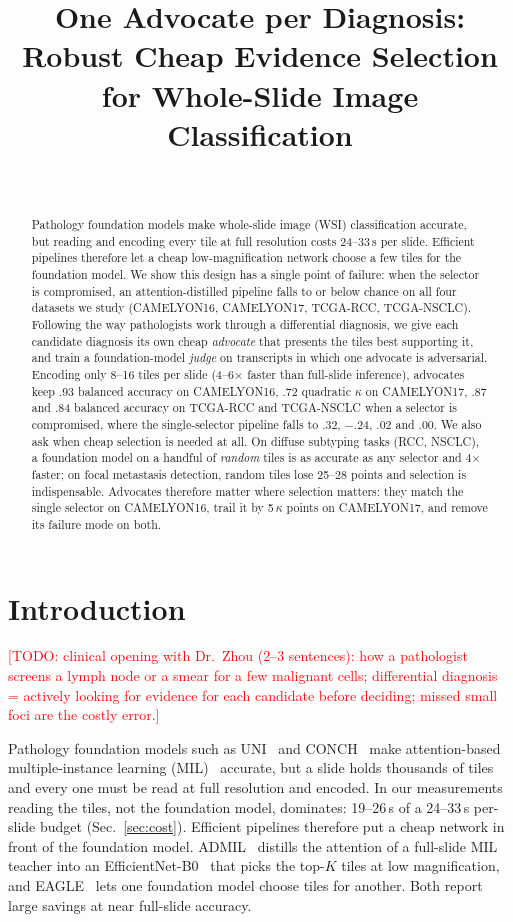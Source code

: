 \documentclass[10pt,twocolumn]{article}
\title{\Large\bfseries One Advocate per Diagnosis: Robust Cheap Evidence Selection\\for Whole-Slide Image Classification}
\author{\todo{authors: you, Dr.\ Chen Zhou, advisor} \\ \todo{affiliations}}
\date{}
\newcommand{\todo}[1]{\textcolor{red}{[TODO: #1]}}
\begin{document}
\maketitle

\begin{abstract}
Pathology foundation models make whole-slide image (WSI) classification accurate, but reading and encoding every tile at full resolution costs 24--33\,s per slide. Efficient pipelines therefore let a cheap low-magnification network choose a few tiles for the foundation model. We show this design has a single point of failure: when the selector is compromised, an attention-distilled pipeline falls to or below chance on all four datasets we study (CAMELYON16, CAMELYON17, TCGA-RCC, TCGA-NSCLC). Following the way pathologists work through a differential diagnosis, we give each candidate diagnosis its own cheap \emph{advocate} that presents the tiles best supporting it, and train a foundation-model \emph{judge} on transcripts in which one advocate is adversarial. Encoding only 8--16 tiles per slide (4--6$\times$ faster than full-slide inference), advocates keep .93 balanced accuracy on CAMELYON16, .72 quadratic $\kappa$ on CAMELYON17, .87 and .84 balanced accuracy on TCGA-RCC and TCGA-NSCLC when a selector is compromised, where the single-selector pipeline falls to .32, $-$.24, .02 and .00. We also ask when cheap selection is needed at all. On diffuse subtyping tasks (RCC, NSCLC), a foundation model on a handful of \emph{random} tiles is as accurate as any selector and 4$\times$ faster; on focal metastasis detection, random tiles lose 25--28 points and selection is indispensable. Advocates therefore matter where selection matters: they match the single selector on CAMELYON16, trail it by 5\,$\kappa$ points on CAMELYON17, and remove its failure mode on both.
\end{abstract}

\section{Introduction}
\todo{clinical opening with Dr.\ Zhou (2--3 sentences): how a pathologist screens a lymph node or a smear for a few malignant cells; differential diagnosis = actively looking for evidence for each candidate before deciding; missed small foci are the costly error.}

Pathology foundation models such as UNI~\cite{uni} and CONCH~\cite{conch} make attention-based multiple-instance learning (MIL)~\cite{ilse2018abmil,lu2021data} accurate, but a slide holds thousands of tiles and every one must be read at full resolution and encoded. In our measurements reading the tiles, not the foundation model, dominates: 19--26\,s of a 24--33\,s per-slide budget (Sec.~\ref{sec:cost}). Efficient pipelines therefore put a cheap network in front of the foundation model. ADMIL~\cite{admil2026} distills the attention of a full-slide MIL teacher into an EfficientNet-B0~\cite{tan2019efficientnet} that picks the top-$K$ tiles at low magnification, and EAGLE~\cite{eagle2026} lets one foundation model choose tiles for another. Both report large savings at near full-slide accuracy.
\end{document}
